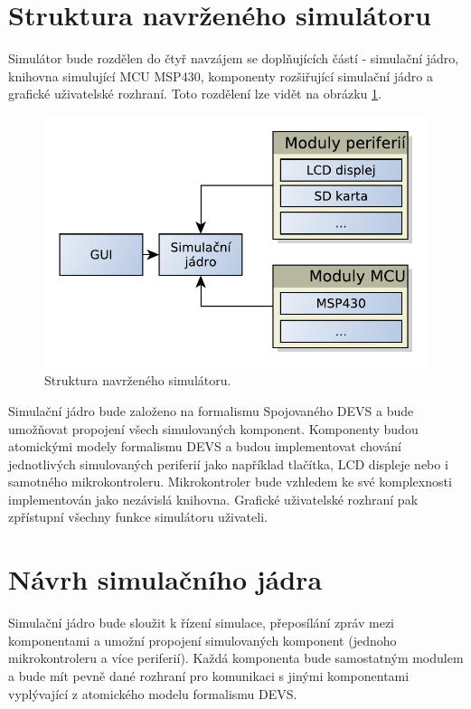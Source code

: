 \section{Struktura navrženého simulátoru}

Simulátor bude rozdělen do čtyř navzájem se doplňujících částí - simulační jádro, knihovna simulující MCU MSP430, komponenty rozšiřující simulační jádro a grafické uživatelské rozhraní. Toto rozdělení lze vidět na obrázku \ref{fig:struktura}.

\begin{figure}[ht]
\centering
\includegraphics[trim=0cm 0cm 0cm 0cm, scale=0.7]{fig/struktura}
\caption{Struktura navrženého simulátoru.}
\label{fig:struktura}
\end{figure}

Simulační jádro bude založeno na formalismu Spojovaného DEVS a bude umožňovat propojení všech simulovaných komponent. Komponenty budou atomickými modely formalismu DEVS a budou implementovat chování jednotlivých simulovaných periferií jako například tlačítka, LCD displeje nebo i samotného mikrokontroleru. Mikrokontroler bude vzhledem ke své komplexnosti implementován jako nezávislá knihovna. Grafické uživatelské rozhraní pak zpřístupní všechny funkce simulátoru uživateli.

\section{Návrh simulačního jádra}

Simulační jádro bude sloužit k řízení simulace, přeposílání zpráv mezi komponentami a umožní propojení simulovaných komponent (jednoho mikrokontroleru a více periferií). Každá komponenta bude samostatným modulem a bude mít pevně dané rozhraní pro komunikaci s jinými komponentami vyplývající z atomického modelu formalismu DEVS.

